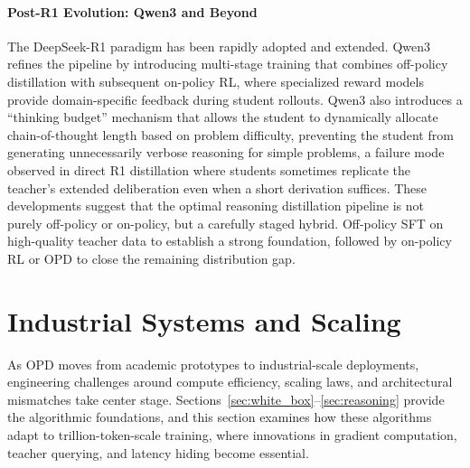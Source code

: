 \documentclass{article} %
\begin{document}
\paragraph{Post-R1 Evolution: Qwen3 and Beyond}
The DeepSeek-R1 paradigm has been rapidly adopted and extended. Qwen3 \citep{2505.09388} refines the pipeline by introducing multi-stage training that combines off-policy distillation with subsequent on-policy RL, where specialized reward models provide domain-specific feedback during student rollouts. Qwen3 also introduces a ``thinking budget'' mechanism that allows the student to dynamically allocate chain-of-thought length based on problem difficulty, preventing the student from generating unnecessarily verbose reasoning for simple problems, a failure mode observed in direct R1 distillation where students sometimes replicate the teacher's extended deliberation even when a short derivation suffices. These developments suggest that the optimal reasoning distillation pipeline is not purely off-policy or on-policy, but a carefully staged hybrid. Off-policy SFT on high-quality teacher data to establish a strong foundation, followed by on-policy RL or OPD to close the remaining distribution gap.

\section{Industrial Systems and Scaling}
\label{sec:systems}

As OPD moves from academic prototypes to industrial-scale deployments, engineering challenges around compute efficiency, scaling laws, and architectural mismatches take center stage. Sections~\ref{sec:white_box}--\ref{sec:reasoning} provide the algorithmic foundations, and this section examines how these algorithms adapt to trillion-token-scale training, where innovations in gradient computation, teacher querying, and latency hiding become essential.
\end{document}
